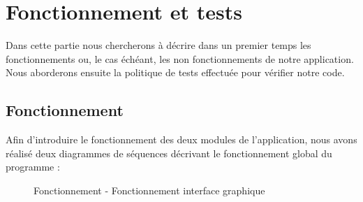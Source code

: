 \chapter{Fonctionnement et tests}

Dans cette partie nous chercherons à décrire dans un premier temps les fonctionnements ou, le cas échéant, les non fonctionnements de notre application.  Nous aborderons ensuite la politique de tests effectuée pour vérifier notre code. 

\section{Fonctionnement}

Afin d'introduire le fonctionnement des deux modules de l'application, nous avons réalisé deux diagrammes de séquences décrivant le fonctionnement global du programme :

\begin{figure}[!ht]
\begin{center}
  \caption{Fonctionnement - Fonctionnement interface graphique}
  \label{sequence} 
\end{center}
\end{figure}

